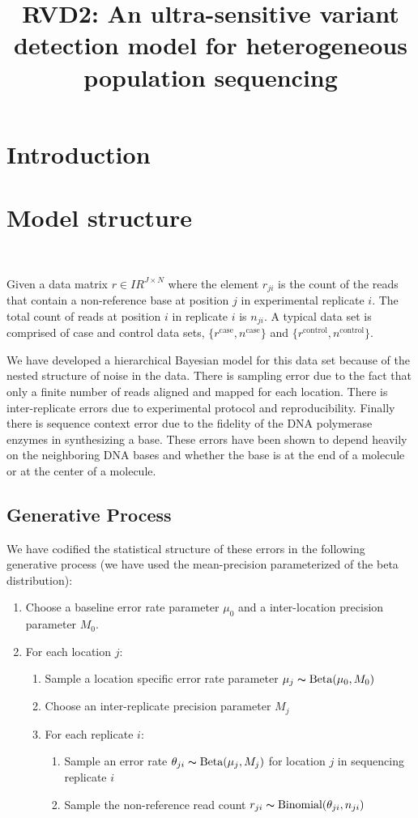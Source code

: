 \documentclass[11pt,reqno]{amsart}
\title[RVD2]{RVD2: An ultra-sensitive variant detection model for heterogeneous population sequencing}
\author{}
\newcommand{\RR}{I\!\!R} %
\begin{document}
\maketitle

\section{Introduction}

\section{Model structure}\

Given a data matrix $r \in \RR^{J \times N}$ where the element $r_{ji}$ is the count of the reads that contain a non-reference base at position $j$ in experimental replicate $i$. The total count of reads at position $i$ in replicate $i$ is $n_{ji}$. A typical data set is comprised of case and control data sets, $\{ r^{\text{case}} , n^{\text{case}} \}$ and  $\{ r^{\text{control}} , n^{\text{control}} \}$. 

We have developed a hierarchical Bayesian model for this data set because of the nested structure of noise in the data. There is sampling error due to the fact that only a finite number of reads aligned and mapped for each location. There is inter-replicate errors due to experimental protocol and reproducibility. Finally there is sequence context error due to the fidelity of the DNA polymerase enzymes in synthesizing a base. These errors have been shown to depend heavily on the neighboring DNA bases and whether the base is at the end of a molecule or at the center of a molecule.

\subsection{Generative Process} We have codified the statistical structure of these errors in the following generative process (we have used the mean-precision parameterized of the beta distribution): 

\begin{enumerate}
	\item Choose a baseline error rate parameter $\mu_0$ and a inter-location precision parameter $M_0$.
	\item For each location $j$:
	\begin{enumerate}
		\item Sample a location specific error rate parameter $\mu_j \thicksim \text{Beta}(\mu_0, M_0)$
		\item Choose an inter-replicate precision parameter $M_j$
		\item For each replicate $i$:
		\begin{enumerate}
			\item Sample an error rate $\theta_{ji} \thicksim \text{Beta}(\mu_j, M_j)$ for location $j$ in sequencing replicate $i$
			\item Sample the non-reference read count $r_{ji} \thicksim \text{Binomial}(\theta_{ji}, n_{ji})$
		\end{enumerate}
	\end{enumerate}
\end{enumerate}
\end{document}
